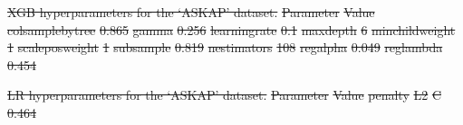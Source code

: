 \documentclass[11pt, a4paper]{book}
\providecommand{\DIFdeltex}[1]{{\protect\color{red}\sout{#1}}}                      %
\providecommand{\DIFdelFL}[1]{\DIFdel{#1}} %
\providecommand{\DIFdel}[1]{\texorpdfstring{\DIFdeltex{#1}}{}} %
\begin{document}
{%
\DIFdelFL{XGB hyperparameters for the `ASKAP' dataset.}}
\DIFdelFL{Parameter }%
\DIFdelFL{Value}%
\DIFdelFL{colsample\textunderscore{}bytree }%
\DIFdelFL{0.865}%
\DIFdelFL{gamma }%
\DIFdelFL{0.256}%
\DIFdelFL{learning\textunderscore{}rate }%
\DIFdelFL{0.1}%
\DIFdelFL{max\textunderscore{}depth }%
\DIFdelFL{6}%
\DIFdelFL{min\textunderscore{}child\textunderscore{}weight }%
\DIFdelFL{1}%
\DIFdelFL{scale\textunderscore{}pos\textunderscore{}weight }%
\DIFdelFL{1}%
\DIFdelFL{subsample }%
\DIFdelFL{0.819}%
\DIFdelFL{n\textunderscore{}estimators }%
\DIFdelFL{108}%
\DIFdelFL{reg\textunderscore{}alpha }%
\DIFdelFL{0.049}%
\DIFdelFL{reg\textunderscore{}lambda }%
\DIFdelFL{0.454}%

{%
\DIFdelFL{LR hyperparameters for the `ASKAP' dataset.}}
\DIFdelFL{Parameter }%
\DIFdelFL{Value}%
\DIFdelFL{penalty }%
\DIFdelFL{L2}%
\DIFdelFL{C }%
\DIFdelFL{0.464}%
\end{document}
